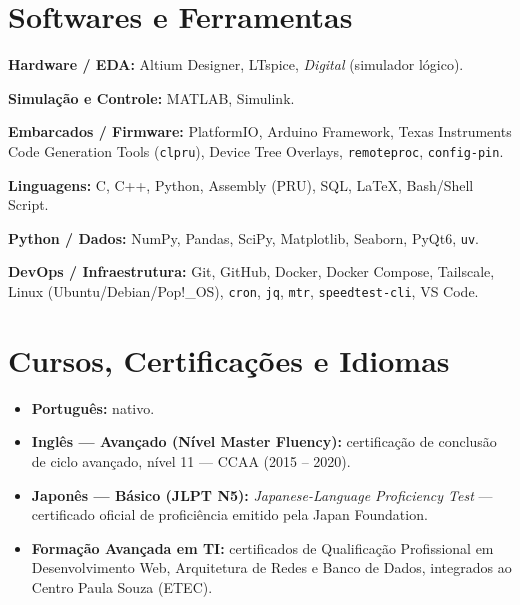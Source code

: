 \documentclass[a4paper,11pt]{article}
\begin{document}
\section*{Softwares e Ferramentas}

\textbf{Hardware / EDA:} Altium Designer, LTspice, \textit{Digital} (simulador lógico).

\textbf{Simulação e Controle:} MATLAB, Simulink.

\textbf{Embarcados / Firmware:} PlatformIO, Arduino Framework, Texas Instruments Code Generation Tools (\texttt{clpru}), Device Tree Overlays, \texttt{remoteproc}, \texttt{config-pin}.

\textbf{Linguagens:} C, C++, Python, Assembly (PRU), SQL, \LaTeX, Bash/Shell Script.

\textbf{Python / Dados:} NumPy, Pandas, SciPy, Matplotlib, Seaborn, PyQt6, \texttt{uv}.

\textbf{DevOps / Infraestrutura:} Git, GitHub, Docker, Docker Compose, Tailscale, Linux (Ubuntu/Debian/Pop!\_OS), \texttt{cron}, \texttt{jq}, \texttt{mtr}, \texttt{speedtest-cli}, VS Code.


\section*{Cursos, Certificações e Idiomas}

\begin{itemize}
\item \textbf{Português:} nativo.
\item \textbf{Inglês --- Avançado (Nível Master Fluency):} certificação de conclusão de ciclo avançado, nível 11 --- CCAA (2015 -- 2020).
\item \textbf{Japonês --- Básico (JLPT N5):} \textit{Japanese-Language Proficiency Test} --- certificado oficial de proficiência emitido pela Japan Foundation.
\item \textbf{Formação Avançada em TI:} certificados de Qualificação Profissional em Desenvolvimento Web, Arquitetura de Redes e Banco de Dados, integrados ao Centro Paula Souza (ETEC).
\end{itemize}
\end{document}
